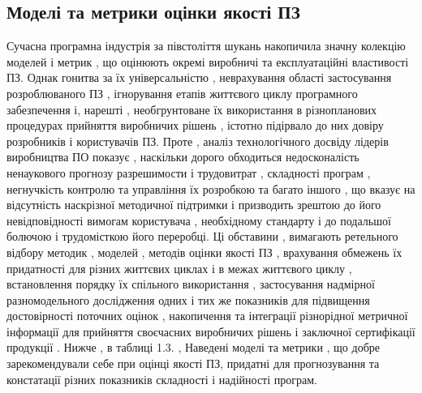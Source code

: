 \documentclass[oneside,final,14pt]{extreport}
\begin{document}
\subsection{Моделі та метрики оцінки якості ПЗ}
\label{2section:id6}
Сучасна програмна індустрія за півстоліття шукань накопичила значну колекцію моделей і метрик , що оцінюють окремі виробничі та експлуатаційні властивості ПЗ. Однак гонитва за їх універсальністю , неврахування області застосування розроблюваного ПЗ , ігнорування етапів життєвого циклу програмного забезпечення і, нарешті , необгрунтоване їх використання в різнопланових процедурах прийняття виробничих рішень , істотно підірвало до них довіру розробників і користувачів ПЗ.
Проте , аналіз технологічного досвіду лідерів виробництва ПО показує , наскільки дорого обходиться недосконалість ненаукового прогнозу разрешимости і трудовитрат , складності програм , негнучкість контролю та управління їх розробкою та багато іншого , що вказує на відсутність наскрізної методичної підтримки і призводить зрештою до його невідповідності вимогам користувача , необхідному стандарту і до подальшої болючою і трудомісткою його переробці. Ці обставини , вимагають ретельного відбору методик , моделей , методів оцінки якості ПЗ , врахування обмежень їх придатності для різних життєвих циклах і в межах життєвого циклу , встановлення порядку їх спільного використання , застосування надмірної разномодельного дослідження одних і тих же показників для підвищення достовірності поточних оцінок , накопичення та інтеграції різнорідної метричної інформації для прийняття своєчасних виробничих рішень і заключної сертифікації продукції . Нижче , в таблиці 1.3. , Наведені моделі та метрики , що добре зарекомендували себе при оцінці якості ПЗ, придатні для прогнозування та констатації різних показників складності і надійності програм.
\end{document}
